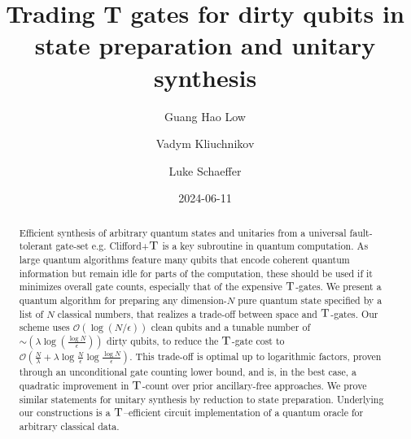 \documentclass[a4paper,onecolumn,10pt,accepted=2024-05-22]{quantumarticle}
\begin{document}
	\title{Trading T gates for dirty qubits in state preparation and unitary synthesis}
	
	\author{Guang Hao Low}
	\author{Vadym Kliuchnikov}
	\author{Luke Schaeffer}
	
	
	\date{2024-06-11}%
	
	\begin{abstract}
		Efficient synthesis of arbitrary quantum states and unitaries from a universal fault-tolerant gate-set e.g. Clifford+$\textsc{T}$ is a key subroutine in quantum computation. As large quantum algorithms feature many qubits that encode coherent quantum information but remain idle for parts of the computation, these should be used if it minimizes overall gate counts, especially that of the expensive $\textsc{T}$-gates. We present a quantum algorithm for preparing any dimension-$N$ pure quantum state specified by a list of $N$ classical numbers, that realizes a trade-off between space and $\textsc{T}$-gates. Our scheme uses $\mathcal{O}(\log{(N/\epsilon)})$ clean qubits and a tunable number of $\sim(\lambda\log{(\frac{\log{N}}{\epsilon})})$ dirty qubits, to reduce the $\textsc{T}$-gate cost to $\mathcal{O}(\frac{N}{\lambda}+\lambda\log{\frac{N}{\epsilon}}\log{\frac{\log{N}}{\epsilon}})$. This trade-off is optimal up to logarithmic factors, proven through an unconditional gate counting lower bound, and is, in the best case, a quadratic improvement in $\textsc{T}$-count over prior ancillary-free approaches. We prove similar statements for unitary synthesis by reduction to state preparation. Underlying our constructions is a $\textsc{T}$--efficient circuit implementation of a quantum oracle for arbitrary classical data. 
	\end{abstract}
	
	\maketitle
	\tableofcontents
\end{document}
